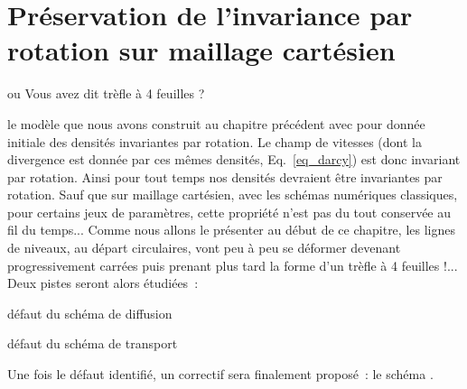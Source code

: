 \documentclass[main.tex]{subfiles}
\begin{document}
\chapter{Préservation de l'invariance par rotation sur maillage cartésien \label{chap:trefle}}
\vspace{-13mm}
\begin{flushright}
{ \Large\sf ou Vous avez dit trèfle à 4 feuilles ?\ }
\end{flushright}
%

 le modèle que nous avons construit au chapitre précédent avec pour donnée initiale des densités invariantes par rotation. Le champ de vitesses (dont la divergence est  donnée par ces mêmes densités, \cf Eq.~\eqref{eq_darcy}) est donc invariant par rotation. Ainsi pour tout temps nos densités devraient être invariantes par rotation. Sauf que sur maillage cartésien, avec les schémas numériques classiques, pour certains jeux de paramètres,  cette propriété n'est pas du tout conservée au fil du temps... Comme nous allons le présenter au début de ce chapitre, les lignes de niveaux, au départ circulaires, vont peu à peu se déformer devenant progressivement carrées puis prenant plus tard la forme d'un trèfle à 4 feuilles !... Deux pistes seront alors étudiées~:
\begin{myitemize}
\item défaut du schéma de diffusion
\item défaut du schéma de transport
\end{myitemize}


\noindent Une fois le défaut identifié, un correctif sera finalement proposé~: le schéma \twinweno. 
\end{document}
